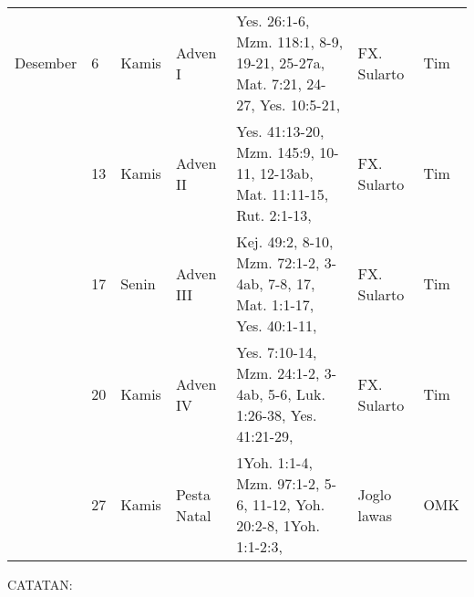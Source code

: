 \begin{flushleft}
\begin{longtable}{|m{1.2cm}|m{0.4cm}|m{0.9cm}|m{1.3cm}|>{\raggedright}m{2.5cm}|m{1.5cm}|m{2.5cm}|}
Desember& 6&Kamis& Adven I& Yes. 26:1-6, Mzm. 118:1, 8-9, 19-21, 25-27a, Mat. 7:21, 24-27, Yes. 10:5-21, & FX. Sularto& Tim\par \\ \cline{2-7}
& 13&Kamis& Adven II& Yes. 41:13-20, Mzm. 145:9, 10-11, 12-13ab, Mat. 11:11-15, Rut. 2:1-13, & FX. Sularto& Tim\par \\ \cline{2-7}
& 17&Senin& Adven III& Kej. 49:2, 8-10, Mzm. 72:1-2, 3-4ab, 7-8, 17, Mat. 1:1-17, Yes. 40:1-11, & FX. Sularto& Tim\par \\ \cline{2-7}
& 20&Kamis& Adven IV& Yes. 7:10-14, Mzm. 24:1-2, 3-4ab, 5-6, Luk. 1:26-38, Yes. 41:21-29, & FX. Sularto& Tim\par \\ \cline{2-7}
& 27&Kamis& Pesta Natal& 1Yoh. 1:1-4, Mzm. 97:1-2, 5-6, 11-12, Yoh. 20:2-8, 1Yoh. 1:1-2:3, & Joglo lawas& OMK\par \\ \cline{2-7}

\end{longtable}
\normalsize \ttfamily
\end{flushleft}
CATATAN:

